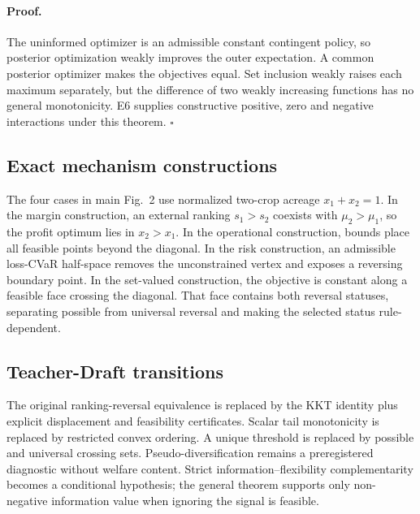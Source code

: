 \paragraph{Proof.} The uninformed optimizer is an admissible constant contingent policy, so posterior optimization weakly improves the outer expectation. A common posterior optimizer makes the objectives equal. Set inclusion weakly raises each maximum separately, but the difference of two weakly increasing functions has no general monotonicity. E6 supplies constructive positive, zero and negative interactions under this theorem. \hfill$\square$

\subsection{Exact mechanism constructions}
The four cases in main Fig.~2 use normalized two-crop acreage $x_1+x_2=1$. In the margin construction, an external ranking $s_1>s_2$ coexists with $\mu_2>\mu_1$, so the profit optimum lies in $x_2>x_1$. In the operational construction, bounds place all feasible points beyond the diagonal. In the risk construction, an admissible loss-CVaR half-space removes the unconstrained vertex and exposes a reversing boundary point. In the set-valued construction, the objective is constant along a feasible face crossing the diagonal. That face contains both reversal statuses, separating possible from universal reversal and making the selected status rule-dependent.

\subsection{Teacher-Draft transitions}
The original ranking-reversal equivalence is replaced by the KKT identity plus explicit displacement and feasibility certificates. Scalar tail monotonicity is replaced by restricted convex ordering. A unique threshold is replaced by possible and universal crossing sets. Pseudo-diversification remains a preregistered diagnostic without welfare content. Strict information--flexibility complementarity becomes a conditional hypothesis; the general theorem supports only non-negative information value when ignoring the signal is feasible.
